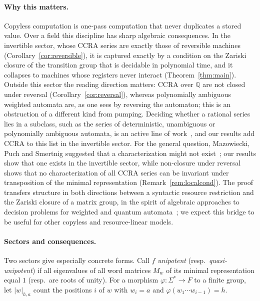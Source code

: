 \documentclass[acmlarge,screen,11pt,nonacm,natbib=false]{acmart}
\newcommand{\Q}{\mathbb{Q}}
\theoremstyle{definition}
\begin{document}
\paragraph{Why this matters.}
Copyless computation is one-pass computation that never duplicates a stored value. Over a field this discipline has sharp algebraic consequences. In the invertible sector, whose CCRA series are exactly those of reversible machines (Corollary~\ref{cor:reversible}), it is captured exactly by a condition on the Zariski closure of the transition group that is decidable in polynomial time, and it collapses to machines whose registers never interact (Theorem~\ref{thm:main}). Outside this sector the reading direction matters: CCRA over $\Q$ are not closed under reversal (Corollary~\ref{cor:reversal}), whereas polynomially ambiguous weighted automata are, as one sees by reversing the automaton; this is an obstruction of a different kind from pumping. Deciding whether a rational series lies in a subclass, such as the series of deterministic, unambiguous or polynomially ambiguous automata, is an active line of work~\cite{BS21,BS23,JMP24,PS24}, and our results add CCRA to this list in the invertible sector. For the general question, Mazowiecki, Puch and Smertnig suggested that a characterization might not exist~\cite{MPS26}; our results show that one exists in the invertible sector, while non-closure under reversal shows that no characterization of all CCRA series can be invariant under transposition of the minimal representation (Remark~\ref{rem:localcond}). The proof transfers structure in both directions between a syntactic resource restriction and the Zariski closure of a matrix group, in the spirit of algebraic approaches to decision problems for weighted and quantum automata~\cite{DJK05,NPSSW22,PS24}; we expect this bridge to be useful for other copyless and resource-linear models.

\paragraph{Sectors and consequences.}
Two sectors give especially concrete forms. Call $f$ \emph{unipotent} (resp.\ \emph{quasi-unipotent}) if all eigenvalues of all word matrices $M_w$ of its minimal representation equal $1$ (resp.\ are roots of unity). For a morphism $\varphi:\Sigma^*\to F$ to a finite group, let $|w|_{h,a}$ count the positions $i$ of $w$ with $w_i=a$ and $\varphi(w_1\cdots w_{i-1})=h$.
\end{document}
